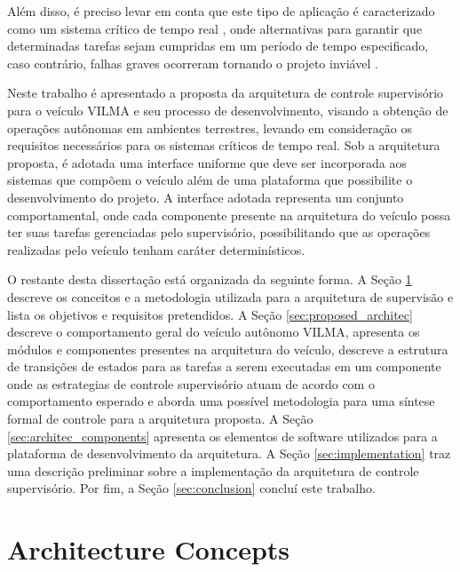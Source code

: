 \documentclass[conference]{IEEEtran}
\begin{document}
Além disso, é preciso levar em conta que este tipo de aplicação é caracterizado como um sistema crítico de tempo real \cite{rtos_safety_mission_4062424} \cite{rtos_analysis_336046}, onde alternativas para garantir que determinadas tarefas sejam cumpridas em um período de tempo especificado, caso contrário, falhas graves ocorreram tornando o projeto inviável \cite{rtos_nasa_monitors} \cite{rtos_choosing_barr2003choosing}.

Neste trabalho é apresentado a proposta da arquitetura de controle supervisório para o veículo VILMA \cite{lma_vilma_website} e seu processo de desenvolvimento, visando a obtenção de operações autônomas em ambientes terrestres, levando em consideração os requisitos necessários para os sistemas críticos de tempo real. Sob a arquitetura proposta, é adotada uma interface uniforme que deve ser incorporada aos sistemas que compõem o veículo além de uma plataforma que possibilite o desenvolvimento do projeto. A interface adotada representa um conjunto comportamental, onde cada componente presente na arquitetura do veículo possa ter suas tarefas gerenciadas pelo supervisório, possibilitando que as operações realizadas pelo veículo tenham caráter determinísticos.

O restante desta dissertação está organizada da seguinte forma. A Seção \ref{sec:architec_concepts} descreve os conceitos e a metodologia utilizada para a arquitetura de supervisão e lista os objetivos e requisitos pretendidos. A Seção \ref{sec:proposed_architec} descreve o comportamento geral do veículo autônomo VILMA, apresenta os módulos e componentes presentes na arquitetura do veículo, descreve a estrutura de transições de estados para as tarefas a serem executadas em um componente onde as estrategias de controle supervisório atuam de acordo com o comportamento esperado e aborda uma possível metodologia para uma síntese formal de controle para a arquitetura proposta. A Seção \ref{sec:architec_components} apresenta os elementos de software utilizados para a plataforma de desenvolvimento da arquitetura. A Seção \ref{sec:implementation} traz uma descrição preliminar sobre a implementação da arquitetura de controle supervisório. Por fim, a Seção \ref{sec:conclusion} concluí este trabalho.

\section{Architecture Concepts}\label{sec:architec_concepts}
\end{document}
